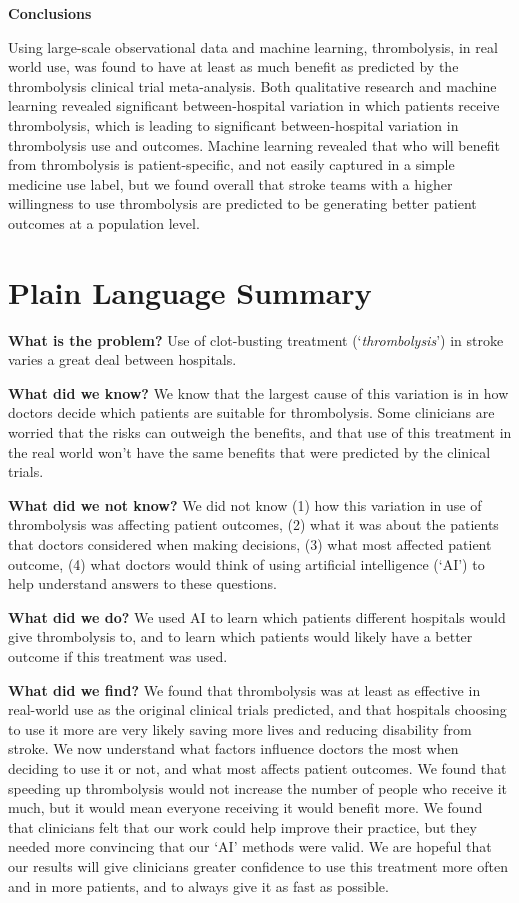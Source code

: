 \textbf{Conclusions}

Using large-scale observational data and machine learning, thrombolysis, in real world use, was found to have at least as much benefit as predicted by the thrombolysis clinical trial meta-analysis. Both qualitative research and machine learning revealed significant between-hospital variation in which patients receive thrombolysis, which is leading to significant between-hospital variation in thrombolysis use and outcomes. Machine learning revealed that who will benefit from thrombolysis is patient-specific, and not easily captured in a simple medicine use label, but we found overall that stroke teams with a higher willingness to use thrombolysis are predicted to be generating better patient outcomes at a population level.

\section*{Plain Language Summary}

\textbf{What is the problem?} Use of clot-busting treatment (`\textit{thrombolysis}') in stroke varies a great deal between hospitals.

\textbf{What did we know?} We know that the largest cause of this variation is in how doctors decide which patients are suitable for thrombolysis. Some clinicians are worried that the risks can outweigh the benefits, and that use of this treatment in the real world won’t have the same benefits that were predicted by the clinical trials.

\textbf{What did we not know?} We did not know (1) how this variation in use of thrombolysis was affecting patient outcomes, (2) what it was about the patients that doctors considered when making decisions, (3) what most affected patient outcome, (4) what doctors would think of using artificial intelligence (`AI') to help understand answers to these questions.

\textbf{What did we do?} We used AI to learn which patients different hospitals would give thrombolysis to, and to learn which patients would likely have a better outcome if this treatment was used.

\textbf{What did we find?} We found that thrombolysis was at least as effective in real-world use as the original clinical trials predicted, and that hospitals choosing to use it more are very likely saving more lives and reducing disability from stroke. We now understand what factors influence doctors the most when deciding to use it or not, and what most affects patient outcomes. We found that speeding up thrombolysis would not increase the number of people who receive it much, but it would mean everyone receiving it would benefit more. We found that clinicians felt that our work could help improve their practice, but they needed more convincing that our ‘AI’ methods were valid. We are hopeful that our results will give clinicians greater confidence to use this treatment more often and in more patients, and to always give it as fast as possible.